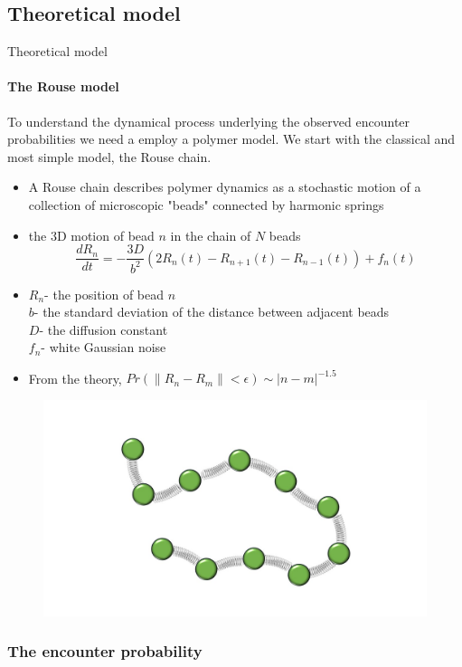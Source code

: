 \documentclass[8pt]{beamer}
\begin{document}
\subsection{Theoretical model}\label{section_theoreticalModel}

\begin{frame}{Theoretical model}
\framesubtitle{The Rouse model}
To understand the dynamical process underlying the observed encounter probabilities we need a employ a polymer model. We start with the classical and most simple model, the Rouse chain.
\begin{itemize}
\item A Rouse chain describes polymer dynamics as a stochastic motion of a collection of microscopic "beads" connected by harmonic springs
\item the 3D  motion of bead $n$ in the chain of $N$ beads 
\begin{equation*}
\frac{dR_n}{dt} = -\frac{3D}{b^2}(2R_n(t)-R_{n+1}(t)-R_{n-1}(t))+f_n(t)
\end{equation*}
\item $R_n$- the position of bead $n$\\
$b$- the standard deviation of the distance between adjacent beads\\
$D$- the diffusion constant\\
$f_n$- white Gaussian noise
\item From the theory, $Pr(\|R_n-R_m\|<\epsilon)\sim  |n-m|^{-1.5}$
\end{itemize}

\begin{figure}[H]
\includegraphics[scale=0.1]{RousePolymerSketch}
\end{figure}
\end{frame}

\subsubsection{The encounter probability}\label{subsubsection_theEncounterProbability}
\end{document}
